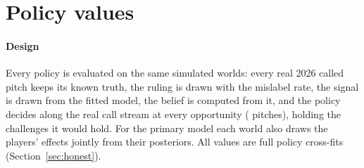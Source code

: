 \documentclass[aoas]{imsart}
\theoremstyle{plain}
\theoremstyle{definition}
\begin{document}
\section{Policy values}\label{sec:eval}

\paragraph{Design} Every policy is evaluated on the same simulated worlds: every real 2026 called pitch keeps its known
truth, the ruling is drawn with the mislabel rate, the signal is drawn from the fitted model, the belief is computed
from it, and the policy decides along the real call stream at every opportunity (\NEvalOpp{} pitches), holding the
challenges it would hold. For the primary model each world also draws the players' effects jointly from their
posteriors. All values are full policy cross-fits (Section~\ref{sec:honest}).
\end{document}
